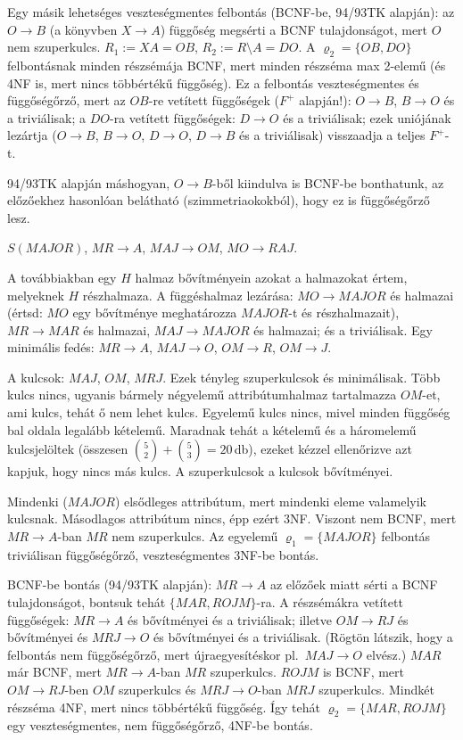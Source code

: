 \documentclass[a5paper]{article}
\begin{document}
Egy másik lehetséges veszteségmentes felbontás (BCNF-be, 94/93TK alapján):
az $O\to B$ (a könyvben $X\to A$)
függőség megsérti a BCNF tulajdonságot, mert $O$ nem szuperkulcs.
$R_1:=XA=OB$, $R_2:=R\setminus A=DO$. A $\varrho_2=\{OB,DO\}$ felbontásnak
minden részsémája BCNF, mert minden részséma max 2-elemű (és 4NF is, mert
nincs többértékű függőség).
Ez a felbontás veszteségmentes és függőségőrző, mert az $OB$-re vetített függőségek
($F^+$ alapján!): $O\to B$, $B\to O$ és a triviálisak; a $DO$-ra vetített függőségek:
$D\to O$ és a triviálisak; ezek uniójának lezártja ($O\to B$, $B\to O$,
$D\to O$, $D\to B$ és a triviálisak) visszaadja a teljes $F^+$-t.

94/93TK alapján máshogyan, $O\to B$-ből kiindulva is BCNF-be bonthatunk, az
előzőekhez hasonlóan belátható (szimmetriaokokból), hogy ez is
függőségőrző lesz.

$S(MAJOR)$, $MR\to A$, $MAJ\to OM$, $MO\to RAJ$.

\megoldas A továbbiakban egy $H$ halmaz bővítményein azokat a halmazokat
értem, melyeknek $H$ részhalmaza. A függéshalmaz lezárása: $MO\to MAJOR$ és
halmazai (értsd: $MO$ egy bővítménye meghatározza $MAJOR$-t és részhalmazait),
$MR\to MAR$ és halmazai, $MAJ\to MAJOR$ és halmazai; és a triviálisak. Egy
minimális fedés: $MR\to A$, $MAJ\to O$, $OM\to R$, $OM\to J$.

A kulcsok: $MAJ$, $OM$, $MRJ$. Ezek tényleg szuperkulcsok és minimálisak.
Több kulcs nincs, ugyanis bármely négyelemű attribútumhalmaz tartalmazza $OM$-et,
ami kulcs, tehát ő nem lehet kulcs. Egyelemű kulcs nincs, mivel minden függőség
bal oldala legalább kételemű. Maradnak tehát a kételemű és a háromelemű
kulcsjelöltek (összesen ${5\choose 2} + {5\choose 3} = 20\,$db), ezeket kézzel ellenőrizve azt kapjuk, hogy nincs más kulcs. A
szuperkulcsok a kulcsok bővítményei.

Mindenki ($MAJOR$) elsődleges attribútum, mert mindenki eleme valamelyik
kulcsnak. Másodlagos attribútum nincs, épp ezért 3NF. Viszont nem BCNF, mert
$MR\to A$-ban $MR$ nem szuperkulcs. Az egyelemű $\varrho_1=\{MAJOR\}$
felbontás triviálisan függőségőrző, veszteségmentes 3NF-be bontás.

BCNF-be bontás (94/93TK alapján): $MR\to A$ az előzőek miatt sérti a BCNF
tulajdonságot, bontsuk tehát $\{MAR,ROJM\}$-ra. A részsémákra vetített
függőségek: $MR\to A$ és bővítményei és a triviálisak; illetve $OM\to RJ$
és bővítményei és $MRJ\to O$ és bővítményei és a triviálisak. (Rögtön
látszik, hogy a felbontás nem függőségőrző, mert újraegyesítéskor
pl.\ $MAJ\to O$ elvész.) $MAR$ már BCNF, mert $MR\to A$-ban $MR$
szuperkulcs. $ROJM$ is BCNF, mert $OM\to RJ$-ben $OM$ szuperkulcs és $MRJ\to
O$-ban $MRJ$ szuperkulcs. Mindkét részséma 4NF, mert nincs többértékű
függőség. Így tehát $\varrho_2=\{MAR,ROJM\}$ egy
veszteségmentes, nem függőségőrző, 4NF-be bontás.
\end{document}
